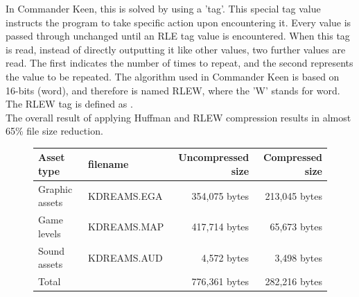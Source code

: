 \documentclass[book.tex]{subfiles}
\begin{document}
\par
In Commander Keen, this is solved by using a 'tag'. This special tag value instructs the program to take specific action upon encountering it. Every value is passed through unchanged until an RLE tag value is encountered. When this tag is read, instead of directly outputting it like other values, two further values are read. The first indicates the number of times to repeat, and the second represents the value to be repeated. The algorithm used in Commander Keen is based on 16-bits (word), and therefore is named RLEW, where the 'W' stands for word. The RLEW tag is defined as .\\

The overall result of applying Huffman and RLEW compression results in almost 65\% file size reduction.\\

\begin{figure}[H]
\centering
{\renewcommand{\arraystretch}{1.2} %
\begin{tabularx}{\textwidth}{X X r r }
  \hline
  \textbf{Asset type} & \textbf{filename} & \textbf{Uncompressed size\protect\footnotemark} & \textbf{Compressed size}\\ \hline
  Graphic assets & KDREAMS.EGA & 354,075 bytes & 213,045 bytes \\
  Game levels & KDREAMS.MAP & 417,714 bytes & 65,673 bytes\\ 
  Sound assets & KDREAMS.AUD & 4,572 bytes & 3,498 bytes\\ \hline
  Total &  & 776,361 bytes & 282,216 bytes\\ \hline
\end{tabularx}
}
\end{figure}

\addtocounter{footnote}{-1}


\par
\begin{minipage}{\textwidth}
 \par
 \end{minipage}\\
 
 
\end{document}
